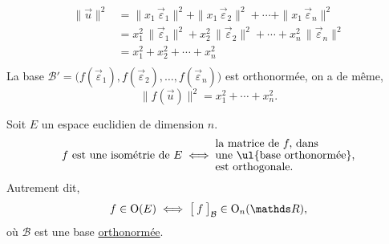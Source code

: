 \begin{prv}
\begin{itemize}
			\begin{align*}
				\|\vec{u}\|^2 &= \|x_1\,\vec{\varepsilon}_1\|^2 + \|x_1\,\vec{\varepsilon}_2\|^2 + \cdots + \|x_1\,\vec{\varepsilon}_n\|^2\\
				&= x_1^2\, \|\vec{\varepsilon}_1\|^2 + x_2^2\, \|\vec{\varepsilon}_2\|^2 + \cdots + x_n^2\, \|\vec{\varepsilon}_n\|^2 \\
				&= x_1^2 + x_2^2 + \cdots + x_n^2 \\
			\end{align*}
			La base $\mathcal{B}' = \big(f(\vec{\varepsilon}_1), f(\vec{\varepsilon}_2), \ldots, f(\vec{\varepsilon}_n)\big)$\/ est orthonormée, on a de même, \[
				\|f(\vec{u})\|^2 = x_1^2 + \cdots + x_n^2
			.\]
	\end{itemize}
\end{prv}

\begin{prop}
	Soit $E$\/ un espace euclidien de dimension $n$. \[
		f \text{ est une isométrie de } E \iff \substack{\ds\text{la matrice de } f,\, \text{dans}\hfill\\\ds\text{une \ul{base orthonormée},}\hfill\\\ds\text{est orthogonale.}\hfill}
	\]
	Autrement dit, \[
		f \in \mathrm{O}(E) \iff \big[\:f\:\big]_{\mathcal{B}} \in \mathrm{O}_n(\R),
	\] où $\mathcal{B}$\/ est une base \ul{orthonormée}.
\end{prop}


